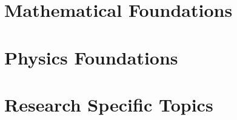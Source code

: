 \documentclass[
    11pt,
    oneside,
]{book}
\begin{document}
    \frontmatter
    
    
    \tableofcontents
    
    

    \mainmatter

    \part{Mathematical Foundations}
    
    
    
    
    
    
    
    
    

    \part{Physics Foundations}
    
    

    \part{Research Specific Topics}
    
    
    
    
    
    

    \nocite{*}

    \backmatter
    \printbibliography
    
\end{document}
